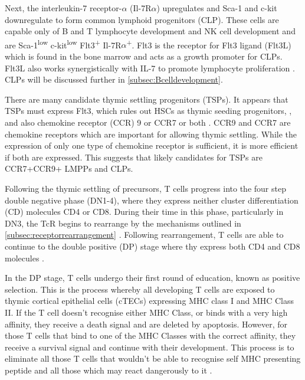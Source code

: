 Next, the interleukin-7 receptor-$\alpha$ (Il-7R$\alpha$) upregulates and Sca-1 and c-kit downregulate to form common lymphoid progenitors (CLP).
These cells are capable only of B and T lymphocyte development and NK cell development \citep{Kondo1997} and are Sca-1\textsuperscript{low} c-kit\textsuperscript{low} Flt3\textsuperscript{+} Il-7R$\alpha$\textsuperscript{+}.
Flt3 is the receptor for Flt3 ligand (Flt3L) which is found in the bone marrow and acts as a growth promoter for CLPs.
Flt3L also works synergistically with IL-7 to promote lymphocyte proliferation \citep{Holmes2006}.
CLPs will be discussed further in \cref{subsec:Bcelldevelopment}.


There are many candidate thymic settling progenitors (TSPs).
It appears that TSPs must express Flt3, which rules out HSCs as thymic seeding progenitors, \citep{Zlotoff2011}, and also chemokine receptor (CCR) 9 or CCR7 or both \citep{Zlotoff2010}.
CCR9 and CCR7 are chemokine receptors which are important for allowing thymic settling. 
While the expression of only one type of chemokine receptor is sufficient, it is more efficient if both are expressed.
This suggests that likely candidates for TSPs are CCR7+CCR9+ LMPPs and CLPs\citep{Zlotoff2011}.

Following the thymic settling of precursors, T cells progress into the four step double negative phase (DN1-4), where they express neither cluster differentiation (CD) molecules CD4 or CD8.
During their time in this phase, particularly in DN3, the TcR begins to rearrange by the mechanisms outlined in \cref{subsec:receptorrearrangement} \citep{Starr2003}.
Following rearrangement, T cells are able to continue to the double positive (DP) stage where thy express both CD4 and CD8 molecules \citep{Zuniga1996}.


In the DP stage, T cells undergo their first round of education, known as positive selection.
This is the process whereby all developing T cells are exposed to thymic cortical epithelial cells (cTECs) expressing MHC class I and MHC Class II.
If the T cell doesn't recognise either MHC Class, or binds with a very high affinity, they receive a death signal and are deleted by apoptosis.
However, for those T cells that bind to one of the MHC Classes with the correct affinity, they receive a survival signal and continue with their development.
This process is to eliminate all those T cells that wouldn't be able to recognise self MHC presenting peptide and all those which  may react dangerously to it \citep{Jameson1998, Starr2003}.

